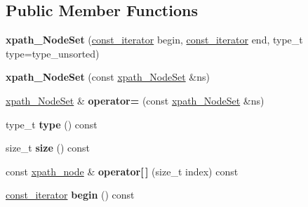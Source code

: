 \subsection*{Public Member Functions}
\begin{DoxyCompactItemize}
\item 
\hypertarget{classphys_1_1xml_1_1xpath__NodeSet_a06c54cc943e8c2b1adbc28f76f624ec7}{
{\bfseries xpath\_\-NodeSet} (\hyperlink{classphys_1_1xml_1_1xpath__node}{const\_\-iterator} begin, \hyperlink{classphys_1_1xml_1_1xpath__node}{const\_\-iterator} end, type\_\-t type=type\_\-unsorted)}
\label{dc/d32/classphys_1_1xml_1_1xpath__NodeSet_a06c54cc943e8c2b1adbc28f76f624ec7}

\item 
\hypertarget{classphys_1_1xml_1_1xpath__NodeSet_a8399c2c6fff5d076f58200b85a666af2}{
{\bfseries xpath\_\-NodeSet} (const \hyperlink{classphys_1_1xml_1_1xpath__NodeSet}{xpath\_\-NodeSet} \&ns)}
\label{dc/d32/classphys_1_1xml_1_1xpath__NodeSet_a8399c2c6fff5d076f58200b85a666af2}

\item 
\hypertarget{classphys_1_1xml_1_1xpath__NodeSet_a1ef1b93d34c2e4fded331788bf0ba45f}{
\hyperlink{classphys_1_1xml_1_1xpath__NodeSet}{xpath\_\-NodeSet} \& {\bfseries operator=} (const \hyperlink{classphys_1_1xml_1_1xpath__NodeSet}{xpath\_\-NodeSet} \&ns)}
\label{dc/d32/classphys_1_1xml_1_1xpath__NodeSet_a1ef1b93d34c2e4fded331788bf0ba45f}

\item 
\hypertarget{classphys_1_1xml_1_1xpath__NodeSet_a3cc00490b0b60355019bfe0c04367597}{
type\_\-t {\bfseries type} () const }
\label{dc/d32/classphys_1_1xml_1_1xpath__NodeSet_a3cc00490b0b60355019bfe0c04367597}

\item 
\hypertarget{classphys_1_1xml_1_1xpath__NodeSet_a7ba8dfcdd245a28a35f477d00e44a0d3}{
size\_\-t {\bfseries size} () const }
\label{dc/d32/classphys_1_1xml_1_1xpath__NodeSet_a7ba8dfcdd245a28a35f477d00e44a0d3}

\item 
\hypertarget{classphys_1_1xml_1_1xpath__NodeSet_a21ee927c283fc105e5ffd41e9b02f0d2}{
const \hyperlink{classphys_1_1xml_1_1xpath__node}{xpath\_\-node} \& {\bfseries operator\mbox{[}$\,$\mbox{]}} (size\_\-t index) const }
\label{dc/d32/classphys_1_1xml_1_1xpath__NodeSet_a21ee927c283fc105e5ffd41e9b02f0d2}

\item 
\hypertarget{classphys_1_1xml_1_1xpath__NodeSet_a90d60d4245686b8477e9c151f56b0d8b}{
\hyperlink{classphys_1_1xml_1_1xpath__node}{const\_\-iterator} {\bfseries begin} () const }
\label{dc/d32/classphys_1_1xml_1_1xpath__NodeSet_a90d60d4245686b8477e9c151f56b0d8b}


\end{DoxyCompactItemize}
